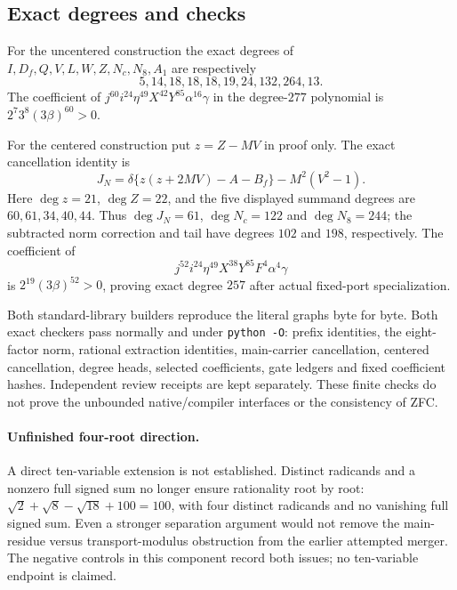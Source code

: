 \subsection{Exact degrees and checks}

For the uncentered construction the exact degrees of
$I,D_f,Q,V,L,W,Z,N_c,N_8,A_1$ are respectively
\[
 5,14,18,18,18,19,24,132,264,13.
\]
The coefficient of
$j^{60}i^{24}\eta^{49}X^{42}Y^{85}\alpha^{16}\gamma$
in the degree-$277$ polynomial is
$2^7 3^8(3\beta)^{60}>0$.

For the centered construction put $z=Z-MV$ in proof only.  The exact
cancellation identity is
\[
 J_N=\delta\{z(z+2MV)-A-B_f\}-M^2(V^2-1).
\]
Here $\deg z=21$, $\deg Z=22$, and the five displayed summand degrees
are $60,61,34,40,44$.  Thus $\deg J_N=61$,
$\deg N_c=122$ and $\deg N_8=244$; the subtracted norm correction
and tail have degrees $102$ and $198$, respectively.  The coefficient of
\[
 j^{52}i^{24}\eta^{49}X^{38}Y^{85}F^4\alpha^4\gamma
\]
is $2^{19}(3\beta)^{52}>0$, proving exact degree $257$ after actual
fixed-port specialization.

Both standard-library builders reproduce the literal graphs byte for
byte.  Both exact checkers pass normally and under \texttt{python -O}:
prefix identities, the eight-factor norm, rational extraction identities,
main-carrier cancellation, centered cancellation, degree heads, selected
coefficients, gate ledgers and fixed coefficient hashes.  Independent
review receipts are kept separately.  These finite checks do not prove
the unbounded native/compiler interfaces or the consistency of ZFC.

\paragraph{Unfinished four-root direction.}
A direct ten-variable extension is not established.  Distinct radicands
and a nonzero full signed sum no longer ensure rationality root by root:
$\sqrt2+\sqrt8-\sqrt{18}+100=100$, with four distinct radicands and
no vanishing full signed sum.  Even a stronger separation argument would
not remove the main-residue versus transport-modulus obstruction from
the earlier attempted merger.  The negative controls in this component
record both issues; no ten-variable endpoint is claimed.
